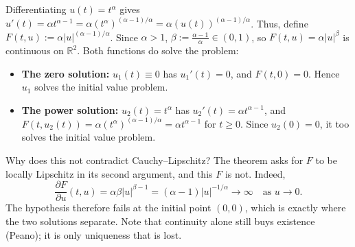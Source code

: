 \begin{exercisesolution}
Differentiating $u(t) = t^\alpha$ gives $u'(t) = \alpha t^{\alpha-1} = \alpha (t^\alpha)^{(\alpha-1)/\alpha} = \alpha (u(t))^{(\alpha-1)/\alpha}$.
Thus, define $F(t,u) := \alpha \lvert u\rvert^{(\alpha-1)/\alpha}$.
Since $\alpha > 1$, $\beta := \frac{\alpha-1}{\alpha} \in (0,1)$, so $F(t,u) = \alpha \lvert u\rvert^\beta$ is continuous on $\mathbb{R}^2$.
Both functions do solve the problem:
\begin{itemize}
  \item \textbf{The zero solution:} $u_1(t) \equiv 0$ has $u_1'(t) = 0$, and $F(t,0) = 0$. Hence $u_1$ solves the initial value problem.
  \item \textbf{The power solution:} $u_2(t) = t^\alpha$ has $u_2'(t) = \alpha t^{\alpha-1}$, and $F(t, u_2(t)) = \alpha (t^\alpha)^{(\alpha-1)/\alpha} = \alpha t^{\alpha-1}$ for $t \ge 0$. Since $u_2(0) = 0$, it too solves the initial value problem.
\end{itemize}

Why does this not contradict Cauchy--Lipschitz? The theorem asks for $F$ to be locally Lipschitz in
its second argument, and this $F$ is not. Indeed,
\[\frac{\partial F}{\partial u}(t,u) = \alpha \beta \lvert u\rvert^{\beta-1} = (\alpha-1) \lvert u\rvert^{-1/\alpha} \longrightarrow \infty \quad \text{as } u \to 0.\]
The hypothesis therefore fails at the initial point $(0,0)$, which is exactly where the two
solutions separate. Note that continuity alone still buys existence (Peano); it is only uniqueness
that is lost.
\end{exercisesolution}

